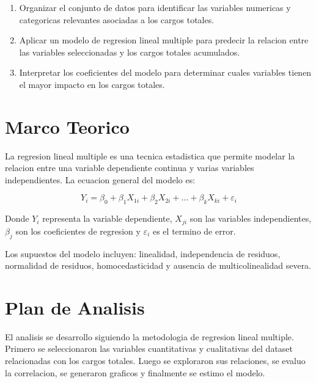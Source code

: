 \documentclass[12pt,a4paper]{article}
\begin{document}
\begin{enumerate}[leftmargin=2cm]
    \item Organizar el conjunto de datos para identificar las variables numericas y categoricas relevantes asociadas a los cargos totales.
    \item Aplicar un modelo de regresion lineal multiple para predecir la relacion entre las variables seleccionadas y los cargos totales acumulados.
    \item Interpretar los coeficientes del modelo para determinar cuales variables tienen el mayor impacto en los cargos totales.
\end{enumerate}

\section{Marco Teorico}

La regresion lineal multiple es una tecnica estadistica que permite modelar la relacion entre una variable dependiente continua y varias variables independientes. La ecuacion general del modelo es:

\begin{equation}
    Y_i = \beta_0 + \beta_1 X_{1i} + \beta_2 X_{2i} + ... + \beta_k X_{ki} + \varepsilon_i
\end{equation}

Donde $Y_i$ representa la variable dependiente, $X_{ji}$ son las variables independientes, $\beta_j$ son los coeficientes de regresion y $\varepsilon_i$ es el termino de error.

Los supuestos del modelo incluyen: linealidad, independencia de residuos, normalidad de residuos, homocedasticidad y ausencia de multicolinealidad severa.

\section{Plan de Analisis}

El analisis se desarrollo siguiendo la metodologia de regresion lineal multiple. Primero se seleccionaron las variables cuantitativas y cualitativas del dataset relacionadas con los cargos totales. Luego se exploraron sus relaciones, se evaluo la correlacion, se generaron graficos y finalmente se estimo el modelo.
\end{document}
